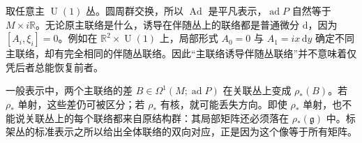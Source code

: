 \begin{example}\label{g1:exm:adjoint-loses-central-connection}
	取任意主 \(\operatorname{U}(1)\) 丛。圆周群交换，所以 \(\operatorname{Ad}\) 是平凡表示，\(\operatorname{ad}P\) 自然等于 \(M\times i\mathbb R\)。无论原主联络是什么，诱导在伴随丛上的联络都是普通微分 \(\mathrm{d}\)，因为 \([A_i,\xi_i]=0\)。例如在 \(\mathbb R^2\times\operatorname{U}(1)\) 上，局部形式 \(A_0=0\) 与 \(A_1=i x\,\mathrm{d}y\) 确定不同主联络，却有完全相同的伴随丛联络。因此“主联络诱导伴随丛联络”并不意味着仅凭后者总能恢复前者。
\end{example}

一般表示中，两个主联络的差 \(B\in\Omega^1(M;\operatorname{ad}P)\) 在关联丛上变成 \(\rho_*(B)\)。若 \(\rho_*\) 单射，这些差仍可被区分；若 \(\rho_*\) 有核，就可能丢失方向。即使 \(\rho_*\) 单射，也不能说关联丛上的每个联络都来自原结构群：其局部矩阵还必须落在 \(\rho_*(\mathfrak g)\) 中。标架丛的标准表示之所以给出全体联络的双向对应，正是因为这个像等于所有矩阵。
